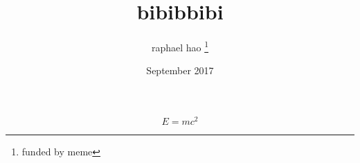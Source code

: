 \documentclass[12pt, a4paper, twoside]{article}
\title{bibibbibi}
\author{raphael hao \thanks{funded by meme}}
\date{September 2017}
\begin{document}
\maketitle
\begin{equation} E = mc^2\end{equation}
\end{document}
